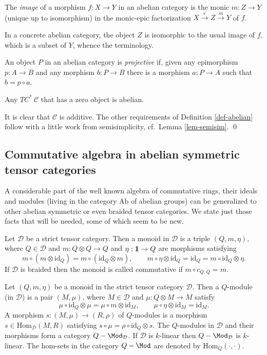 \documentclass[12pt]{article}
\theoremstyle{definition}
\theoremstyle{definition}
\theoremstyle{remark}
\def\2#1{{\mathcal #1}}
\def\1#1{{\bf #1}}
\newcommand{\Hom}{\mathrm{Hom}}
\newcommand{\rarr}{\rightarrow}
\def\id{\mathrm{id}}
\begin{document}
\bdefin {} 
The \emph{image} of a morphism $f:X\rarr Y$ in an abelian category is the monic $m:Z\rarr Y$ (unique
up to isomorphism) in the monic-epic factorization $X\stackrel{e}{\rarr}Z\stackrel{m}{\rarr}Y$ of
$f$.
\edefin

In a concrete abelian category, the object $Z$ is isomorphic to the usual image of $f$, which is a
subset of $Y$, whence the terminology.

\bdefin \label{def-proj} 
An object $P$ in an abelian category is \emph{projective} if, given any epimorphism
$p:A\rarr B$ and any morphism $b:P\rarr B$ there is a morphism $a:P\rarr A$ such that $b=p\circ a$. 
\edefin

\blemma \label{lem-abel}
Any $TC^*\ \2C$ that has a zero object is abelian.
\elemma

\prf It is clear that $\2C$ is additive. The other requirements of Definition \ref{def-abelian}
follow with a little work from semisimplicity, cf.\ Lemma \ref{lem-semisim}.
\qed



\subsection{Commutative algebra in abelian symmetric tensor categories} \label{ss-comm-alg}
A considerable part of the well known algebra of commutative rings, their ideals and modules (living
in the category $\mathrm{Ab}$ of abelian groups) can be generalized to other abelian symmetric or
even braided tensor categories. We state just those facts that will be needed, some of which seem
to be new.

\bdefin \label{def-monoid} 
Let $\2D$ be a strict tensor category. Then a monoid in $\2D$ is a triple $(Q,m,\eta)$,
where $Q\in\2D$ and $m: Q\otimes Q\rarr Q$ and $\eta: \11\rarr Q$ are morphisms satisfying
\[ m\circ(m\otimes\id_Q)=m\circ(\id_Q\otimes m),\quad \quad
   m\circ\eta\otimes\id_Q=\id_Q=m\circ\id_Q\otimes\eta. \]
If $\2D$ is braided then the monoid is called commutative if $m\circ c_{Q,Q}=m$.
\edefin

\bdefin \label{def-module} 
Let $(Q,m,\eta)$ be a monoid in the strict tensor category $\2D$. Then a $Q$-module (in
$\2D$) is a pair $(M,\mu)$, where $M\in\2D$ and $\mu:Q\otimes M\rarr M$ satisfy
\[ \mu\circ\id_Q\otimes \mu = \mu\circ m\otimes\id_M, \quad\quad \mu\circ\eta\otimes\id_M=\id_M. \]
A morphism $s: (M,\mu)\rarr(R,\rho)$ of $Q$-modules is a morphism $s\in\Hom_\2D(M,R)$ satisfying
$s\circ\mu=\rho\circ\id_Q\otimes s$. The $Q$-modules in $\2D$ and their morphisms form a category
$Q-\Mod_\2D$. If $\2D$ is $k$-linear then $Q-\Mod_\2D$ is $k$-linear. The hom-sets in the category
$Q-\Mod$ are denoted by $\Hom_Q(\cdot,\cdot)$.
\edefin
\end{document}
